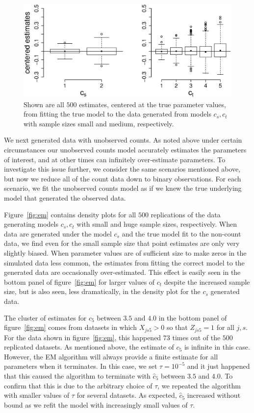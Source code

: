 \begin{figure}
  \centering
  \includegraphics[scale=0.5]{bp}
  \caption{Shown are all $500$ estimates, centered at the true parameter values, from fitting the true model to the data generated from models $c_s,c_t$ with sample sizes small and medium, respectively.}
  \label{fig:bp}
\end{figure}

We next generated data with unobserved counts.  As noted above under certain circumstances our unobserved counts model accurately estimates the parameters of interest, and at other times can infinitely over-estimate parameters.  To investigate this issue further, we consider the same scenarios mentioned above, but now we reduce all of the count data down to binary observations.  For each scenario, we fit the unobserved counts model as if we knew the true underlying model that generated the observed data.

Figure~\ref{fig:em} contains density plots for all $500$ replications of the data generating models $c_s,c_t$ with small and huge sample sizes, respectively.  When data are generated under the model $c_s$ and the true model fit to the non-count data, we find even for the small sample size that point estimates are only very slightly biased.  When parameter values are of sufficient size to make zeros in the simulated data less common, the estimates from fitting the correct model to the generated data are occasionally over-estimated.  This effect is easily seen in the bottom panel of figure~\ref{fig:em} for larger values of $c_t$ despite the increased sample size, but is also seen, less dramatically, in the density plot for the $c_s$ generated data.  

The cluster of estimates for $c_5$ between $3.5$ and $4.0$ in the bottom panel of figure~\ref{fig:em} comes from datasets in which $X_{js5}>0$ so that $Z_{js5}=1$ for all $j,s$.  For the data shown in figure~\ref{fig:em}, this happened $73$ times out of the $500$ replicated datasets.  As mentioned above, the estimate of $c_5$ is infinite in this case. However, the EM algorithm will always provide a finite estimate for all parameters when it terminates.  In this case, we set $\tau=10^{-5}$ and it just happened that this caused the algorithm to terminate with $\hat c_5$ between $3.5$ and $4.0$.  To confirm that this is due to the arbitrary choice of $\tau$, we repeated the algorithm with smaller values of $\tau$ for several datasets. As expected, $\hat c_5$ increased without bound as we refit the model with increasingly small values of $\tau$.

